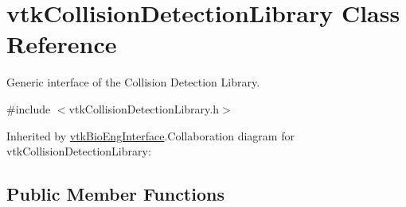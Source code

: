 \hypertarget{classvtkCollisionDetectionLibrary}{
\section{vtkCollisionDetectionLibrary Class Reference}
\label{classvtkCollisionDetectionLibrary}
}


Generic interface of the Collision Detection Library.  


{\ttfamily \#include $<$vtkCollisionDetectionLibrary.h$>$}

Inherited by \hyperlink{classvtkBioEngInterface}{vtkBioEngInterface}.Collaboration diagram for vtkCollisionDetectionLibrary:\subsection*{Public Member Functions}
